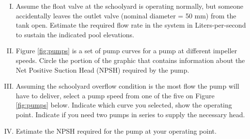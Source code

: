\documentclass[11pt]{article}
\begin{document}
\begin{enumerate}
\begin{enumerate}[(I)]
~\\~\\~\\~\\~\\~\\~\\~\\~\\~\\~\\~\\~\\~\\~\\~\\~\\~\\~\\~\\~\\~\\~\\~\\
\item Assume the float valve at the schoolyard is operating normally, but someone accidentally leaves the outlet valve (nominal diameter = 50 mm) from the tank open.  Estimate the required flow rate in the system in Liters-per-second to sustain the indicated pool elevations.
\clearpage
\item Figure \ref{fig:pumps} is a set of pump curves for a pump at different impeller speeds.  Circle the portion of the graphic that contains information about the Net Positive Suction Head (NPSH) required by the pump.
\item Assuming the schoolyard overflow condition is the most flow the pump will have to deliver, select a pump speed from one of the five on Figure \ref{fig:pumps} below.  Indicate which curve you selected, show the operating point.  Indicate if you need two pumps in series to supply the necessary head.
\item Estimate the NPSH required for the pump at your operating point.


\end{enumerate}
\end{enumerate}
\end{document}
